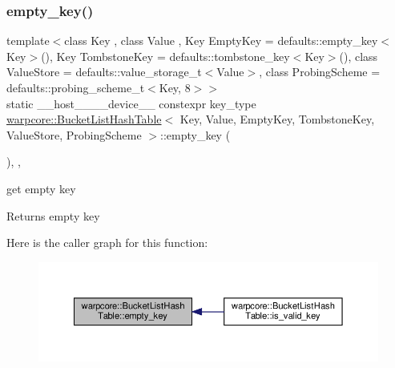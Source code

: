 \subsubsection{\texorpdfstring{empty\+\_\+key()}{empty\_key()}}
{\footnotesize\ttfamily template$<$class Key , class Value , Key Empty\+Key = defaults\+::empty\+\_\+key$<$\+Key$>$(), Key Tombstone\+Key = defaults\+::tombstone\+\_\+key$<$\+Key$>$(), class Value\+Store  = defaults\+::value\+\_\+storage\+\_\+t$<$\+Value$>$, class Probing\+Scheme  = defaults\+::probing\+\_\+scheme\+\_\+t$<$\+Key, 8$>$$>$ \\
static \+\_\+\+\_\+host\+\_\+\+\_\+\+\_\+\+\_\+device\+\_\+\+\_\+ constexpr key\+\_\+type \hyperlink{classwarpcore_1_1BucketListHashTable}{warpcore\+::\+Bucket\+List\+Hash\+Table}$<$ Key, Value, Empty\+Key, Tombstone\+Key, Value\+Store, Probing\+Scheme $>$\+::empty\+\_\+key (\begin{DoxyParamCaption}{ }\end{DoxyParamCaption})\hspace{0.3cm}{\ttfamily [inline]}, {\ttfamily [static]}, {\ttfamily [noexcept]}}



get empty key 

\begin{DoxyReturn}{Returns}
empty key 
\end{DoxyReturn}
Here is the caller graph for this function\+:
\nopagebreak
\begin{figure}[H]
\begin{center}
\leavevmode
\includegraphics[width=350pt]{classwarpcore_1_1BucketListHashTable_ad2c7ebaba6144a640fe66bf09a184c21_icgraph}
\end{center}
\end{figure}
\mbox{\label{classwarpcore_1_1BucketListHashTable_a6d28e8d717936264eb4c2c1a0999c962}} 

